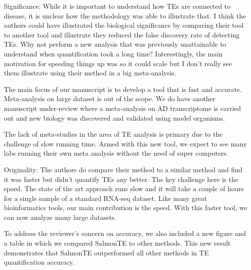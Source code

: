 \documentclass[10pt]{article}
\begin{document}
\begin{response}{Significance: While it is important to understand how TEs are connected to disease, it is unclear how the methodology was able to illustrate that. I think the authors could have illustrated the biological significance by comparing their tool to another tool and illustrate they reduced the false discovery rate of detecting TEs. Why not perform a new analysis that was previously unattainable to understand when quantification took a long time? Interestingly, the main motivation for speeding things up was so it could scale but I don’t really see them illustrate using their method in a big meta-analysis. }

The main focus of our manuscript is to develop a tool that is fast and accurate.  Meta-analysis on large dataset is out of the scope.  We do have another manuscript under-review where a meta-analysis on AD transcriptome is carried out and new biology was discovered and validated using model organisms.  

The lack of meta-studies in the area of TE analysis is primary due to the challenge of slow running time.  Armed with this new tool, we expect to see many labs running their own meta analysis without the need of super computers. 
\end{response}

\begin{response}{Originality: The authors do compare their method to a similar method and find it was faster but didn’t quantify TEs any better.}
The key challenge here is the speed.  The state of the art approach runs slow and it will take a couple of hours for a single sample of a standard RNA-seq dataset. 
Like many great bioinformatics tools, our main contribution is the speed.  With this faster tool, we can now analyze many large datasets. 

To address the reviewer's concern on accuracy, we also included a new figure and a table in which we compared SalmonTE to other methods.  This new result demonstrates that SalmonTE outperformed all other methods in TE quantification accuracy. 
\end{response}
\end{document}
